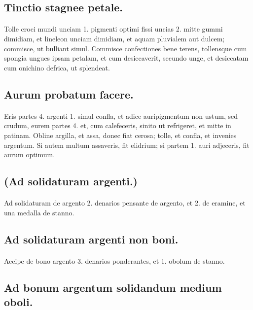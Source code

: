 \documentclass[a4paper, 11pt, oneside, polutonikogreek, italian]{article}
\begin{document}
\subsection{Tinctio stagnee petale.}
\paragraph{}
Tolle croci mundi unciam 1. pigmenti optimi fissi uncias 2. mitte gummi dimidiam, et lineleon unciam dimidiam, et aquam pluvialem aut dulcem; commisce, ut bulliant simul. Commisce confectiones bene terens, tollensque cum spongia ungues ipsam petalam, et cum desiccaverit, secundo unge, et desiccatam cum onichino defrica, ut splendeat.

\subsection{Aurum probatum facere.}
\paragraph{}
Eris partes 4. argenti 1. simul confla, et adice auripigmentum non ustum, sed crudum, eurem partes 4. et, cum calefeceris, sinito ut refrigeret, et mitte in patinam. Obline argilla, et assa, donec fiat cerosa; tolle, et confla, et invenies argentum. Si autem multum assaveris, fit elidrium; si partem 1. auri adjeceris, fit aurum optimum.

\subsection{(Ad solidaturam argenti.)}
\paragraph{}
Ad solidaturam de argento 2. denarios pensante de argento, et 2. de eramine, et una medalla de stanno.

\subsection{Ad solidaturam argenti non boni.}
\paragraph{}
Accipe de bono argento 3. denarios ponderantes, et 1. obolum de stanno.

\subsection{Ad bonum argentum solidandum medium oboli.}
\end{document}
